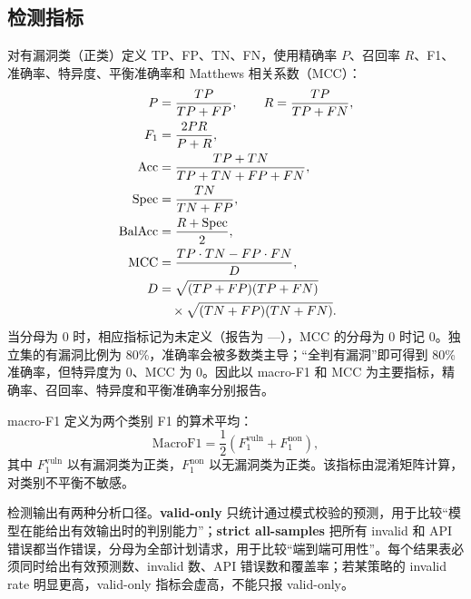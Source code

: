 \documentclass[conference]{IEEEtran}
\begin{document}
\subsection{检测指标}
对有漏洞类（正类）定义 TP、FP、TN、FN，使用精确率 $P$、召回率 $R$、F1、准确率、特异度、平衡准确率和 Matthews 相关系数（MCC）：
\begin{align}
P&=\frac{TP}{TP+FP}, \qquad R=\frac{TP}{TP+FN},\\
F_1&=\frac{2PR}{P+R},\\
\mathrm{Acc}&=\frac{TP+TN}{TP+TN+FP+FN},\\
\mathrm{Spec}&=\frac{TN}{TN+FP},\\
\mathrm{BalAcc}&=\frac{R+\mathrm{Spec}}{2},\\
\mathrm{MCC}&=\frac{TP\cdot TN-FP\cdot FN}{D},\\
D&=\sqrt{(TP+FP)(TP+FN)}\notag\\
&\quad\times\sqrt{(TN+FP)(TN+FN)}.
\end{align}
当分母为 0 时，相应指标记为未定义（报告为 ---），MCC 的分母为 0 时记 0。独立集的有漏洞比例为 80\%，准确率会被多数类主导；“全判有漏洞”即可得到 80\% 准确率，但特异度为 0、MCC 为 0。因此以 macro-F1 和 MCC 为主要指标，精确率、召回率、特异度和平衡准确率分别报告。

macro-F1 定义为两个类别 F1 的算术平均：
\begin{equation}
\mathrm{MacroF1}=\frac{1}{2}\left(F_1^{\mathrm{vuln}}+F_1^{\mathrm{non}}\right),
\end{equation}
其中 $F_1^{\mathrm{vuln}}$ 以有漏洞类为正类，$F_1^{\mathrm{non}}$ 以无漏洞类为正类。该指标由混淆矩阵计算，对类别不平衡不敏感。

检测输出有两种分析口径。\textbf{valid-only} 只统计通过模式校验的预测，用于比较“模型在能给出有效输出时的判别能力”；\textbf{strict all-samples} 把所有 invalid 和 API 错误都当作错误，分母为全部计划请求，用于比较“端到端可用性”。每个结果表必须同时给出有效预测数、invalid 数、API 错误数和覆盖率；若某策略的 invalid rate 明显更高，valid-only 指标会虚高，不能只报 valid-only。
\end{document}
